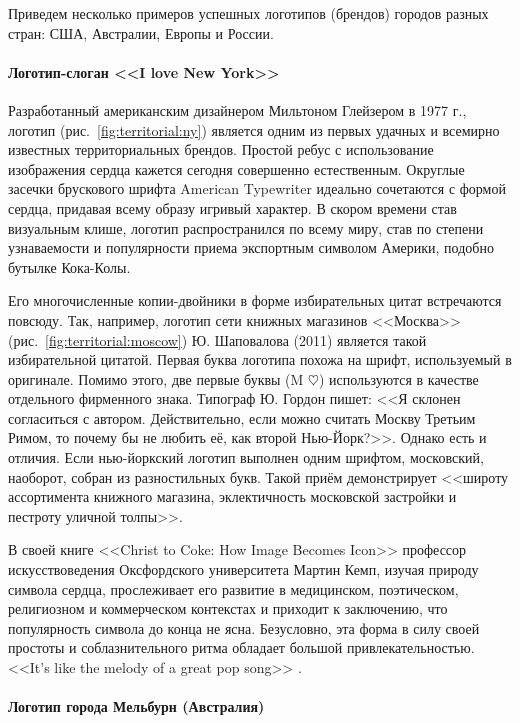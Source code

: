 Приведем несколько примеров успешных логотипов (брендов) городов разных стран: США, Австралии,
Европы и России.

\paragraph{Логотип-слоган <<I love New York>>}

Разработанный американским дизайнером Мильтоном Глейзером в 1977 г., логотип
(рис.~\ref{fig:territorial:ny}) является одним из первых удачных и всемирно известных
территориальных брендов. Простой ребус с использование изображения сердца кажется сегодня совершенно
естественным. Округлые засечки брускового шрифта American Typewriter идеально сочетаются с формой
сердца, придавая всему образу игривый характер. В скором времени став визуальным клише, логотип
распространился по всему миру, став по степени узнаваемости и популярности приема экспортным
символом Америки, подобно бутылке Кока-Колы.

Его многочисленные копии-двойники в форме избирательных цитат встречаются повсюду. Так, например,
логотип сети книжных магазинов <<Москва>> (рис.~\ref{fig:territorial:moscow}) Ю. Шаповалова (2011)
является такой избирательной цитатой. Первая буква логотипа похожа на шрифт, используемый в
оригинале. Помимо этого, две первые буквы (M $\heartsuit$) используются в качестве отдельного
фирменного знака. Типограф Ю. Гордон пишет: <<Я склонен согласиться с автором. Действительно, если
можно считать Москву Третьим Римом, то почему бы не любить её, как второй Нью-Йорк?>>.
\autocite[][347]{book:gordon} Однако есть и отличия. Если нью-йоркский логотип выполнен одним
шрифтом, московский, наоборот, собран из разностильных букв. Такой приём демонстрирует <<широту
ассортимента книжного магазина, эклектичность московской застройки и пестроту уличной толпы>>.
\autocite[][347]{book:gordon}

В своей книге <<Christ to Coke: How Image Becomes Icon>> профессор искусствоведения Оксфордского
университета Мартин Кемп, изучая природу символа сердца, прослеживает его развитие в медицинском,
поэтическом, религиозном и коммерческом контекстах и приходит к заключению, что популярность символа
до конца не ясна. Безусловно, эта форма в силу своей простоты и соблазнительного ритма обладает
большой привлекательностью. <<It’s like the melody of a great pop song>> \autocite[][110]{kemp2011christ}.

\paragraph{Логотип города Мельбурн (Австралия)}

